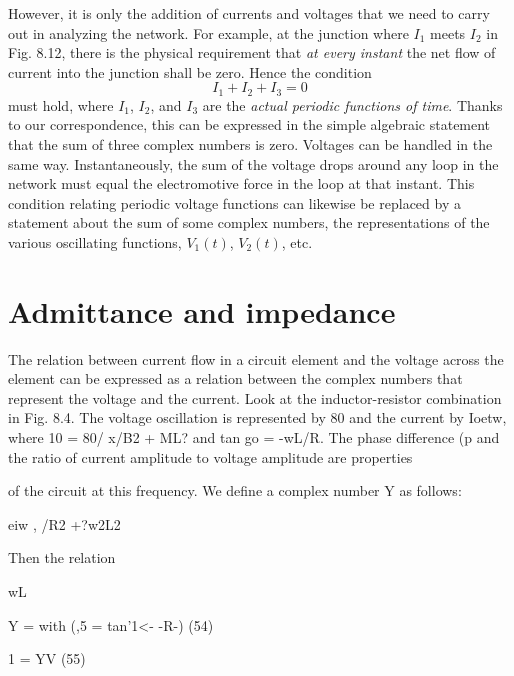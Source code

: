 However, it is only the addition of currents and voltages that we
need to carry out in analyzing the network. For example, at the
junction where $I_1$ meets $I_2$ in Fig. 8.12, there is the physical requirement
that \emph{at every instant} the net flow of current into the junction
shall be zero. Hence the condition
\begin{equation}
  I_1+I_2+I_3 = 0
\end{equation}
must hold, where $I_1$, $I_2$, and $I_3$ are the \emph{actual periodic functions of
time}. Thanks to our correspondence, this can be expressed in the
simple algebraic statement that the sum of three complex numbers
is zero. Voltages can be handled in the same way. Instantaneously,
the sum of the voltage drops around any loop in the network must
equal the electromotive force in the loop at that instant. This condition
relating periodic voltage functions can likewise be replaced by
a statement about the sum of some complex numbers, the representations
of the various oscillating functions, $V_1(t)$, $V_2(t)$, etc.

\iffalse

\section{Admittance and impedance}

The relation between current flow in a circuit element and the
voltage across the element can be expressed as a relation between the
complex numbers that represent the voltage and the current. Look
at the inductor-resistor combination in Fig. 8.4. The voltage oscillation
is represented by 80 and the current by Ioetw, where 10 =
80/ x/B2 + ML? and tan go = -wL/R. The phase difference (p and
the ratio of current amplitude to voltage amplitude are properties

of the circuit at this frequency. We define a complex number Y as
follows:

\begin{equation}
\end{equation}
eiw
, /R2 +?w2L2

Then the relation

\begin{equation}
\end{equation}
wL

Y = with (,5 = tan'1<- -R-) (54)

\begin{equation}
\end{equation}
1 = YV (55)


